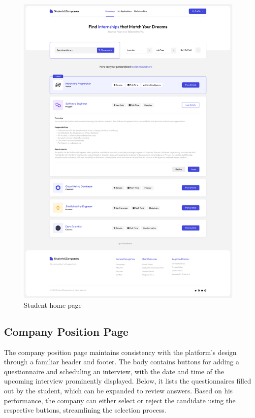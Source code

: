 \begin{figure}
    \centering
    \includegraphics[width=15cm]{images/selected-pages/student-home.png}
    \caption{Student home page}
\end{figure}

\subsection{Company Position Page}
The company position page maintains consistency with the platform's design through a familiar header and footer.
The body contains buttons for adding a questionnaire and scheduling an interview, with the date and time of the upcoming interview prominently displayed.
Below, it lists the questionnaires filled out by the student, which can be expanded to review answers.
Based on his performance, the company can either select or reject the candidate using the respective buttons, streamlining the selection process.

